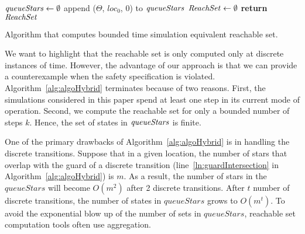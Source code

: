 \begin{algorithm}[h!]
\SetAlgoVlined
{}
${\it queueStars} \gets \emptyset$\; 
append ($\Theta$, $loc_0$, $0$) to ${\it queueStars}$\; 
${\it ReachSet} \gets \emptyset$\;
{\bf return} ${\it ReachSet}$\;
\caption{Algorithm that computes bounded time simulation equivalent reachable set.}
\label{alg:algoHybrid}
\end{algorithm}

We want to highlight that the reachable set is only computed only at discrete instances of time.
%
However, the advantage of our approach is that we can provide a counterexample when the safety specification is violated.
%
Algorithm~\ref{alg:algoHybrid} terminates because of two reasons. First, the simulations considered in this paper spend at least one step in its current mode of operation. Second, we compute the reachable set for only a bounded number of steps $k$. Hence, the set of states in ${\it queueStars}$ is finite.

One of the primary drawbacks of Algorithm~\ref{alg:algoHybrid} is in handling the discrete transitions. 
%
Suppose that in a given location, the number of stars that overlap with the guard of a discrete transition (line~\ref{ln:guardIntersection} in Algorithm~\ref{alg:algoHybrid}) is $m$.
%
As a result, the number of stars in the $queueStars$ will become $O(m^2)$ after 2 discrete transitions. After $t$ number of discrete transitions, the number of states in $queueStars$ grows to $O(m^t)$.
%
To avoid the exponential blow up of the number of sets in $queueStars$, reachable set computation tools often use aggregation.

